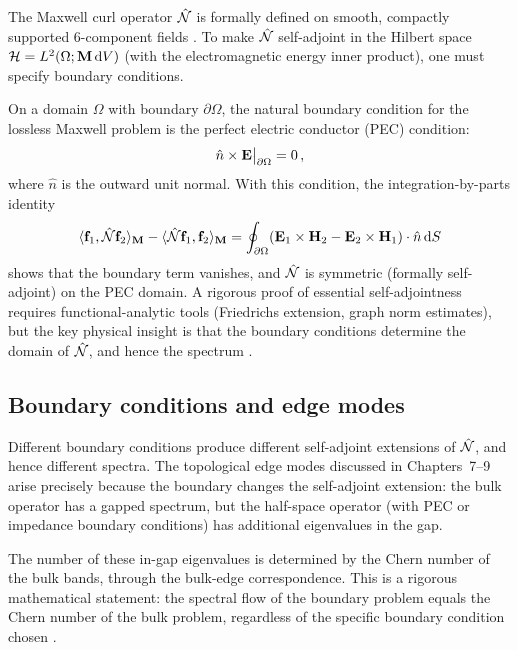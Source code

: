 The Maxwell curl operator $\hat{\mathcal{N}}$ is formally defined on smooth,
compactly supported 6-component fields \cite{bernevig2006quantum}.  To make $\hat{\mathcal{N}}$
self-adjoint in the Hilbert space
$\mathcal{H}=L^2(\Omega;\mathbf{M}\,\mathrm{d} V)$ (with the electromagnetic
energy inner product), one must specify boundary conditions.

On a domain $\Omega$ with boundary $\partial\Omega$, the natural
boundary condition for the lossless Maxwell problem is the perfect
electric conductor (PEC) condition:
\begin{equation}\label{eq:appA-pec}
  \hat{n}\times\mathbf{E}\big|_{\partial\Omega} = 0\,,
\end{equation}
where $\hat{n}$ is the outward unit normal.  With this condition, the
integration-by-parts identity
\begin{equation}\label{eq:appA-ibp-maxwell}
  \langle \mathbf{f}_1 , \hat{\mathcal{N}}\mathbf{f}_2 \rangle_{\mathbf{M}}
  - \langle \hat{\mathcal{N}}\mathbf{f}_1 , \mathbf{f}_2 \rangle_{\mathbf{M}}
  = \oint_{\partial\Omega}
  (\mathbf{E}_1\times\mathbf{H}_2-\mathbf{E}_2\times\mathbf{H}_1)
  \cdot\hat{n}\,\mathrm{d} S
\end{equation}
shows that the boundary term vanishes, and $\hat{\mathcal{N}}$ is symmetric
(formally self-adjoint) on the PEC domain.  A rigorous proof of
essential self-adjointness requires functional-analytic tools
(Friedrichs extension, graph norm estimates), but the key physical
insight is that the boundary conditions determine the domain of
$\hat{\mathcal{N}}$, and hence the spectrum \cite{gangaraj2016berry}.

\subsection{Boundary conditions and edge modes}
\label{sec:appA-bc-edge}

Different boundary conditions produce different self-adjoint
extensions of $\hat{\mathcal{N}}$, and hence different spectra.  The topological
edge modes discussed in Chapters~7--9 arise precisely because the
boundary changes the self-adjoint extension: the bulk operator has a
gapped spectrum, but the half-space operator (with PEC or impedance
boundary conditions) has additional eigenvalues in the gap.

The number of these in-gap eigenvalues is determined by the Chern
number of the bulk bands, through the bulk-edge correspondence.  This
is a rigorous mathematical statement: the spectral flow of the
boundary problem equals the Chern number of the bulk problem,
regardless of the specific boundary condition chosen
\cite{silveirinha2016bulk,ozawa2018topological}.

